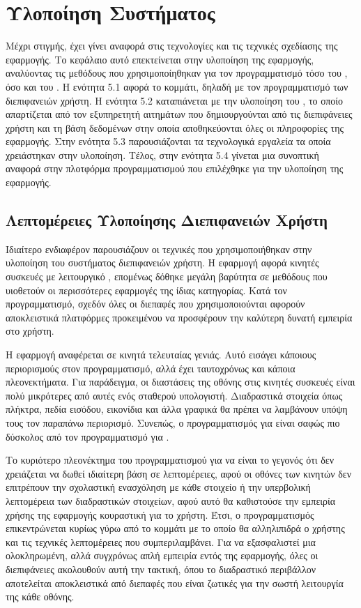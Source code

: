\chapter{Υλοποίηση Συστήματος}
\label{chap5}

Μέχρι στιγμής, έχει γίνει αναφορά στις τεχνολογίες και τις τεχνικές σχεδίασης της εφαρμογής. Το κεφάλαιο αυτό επεκτείνεται στην υλοποίηση της εφαρμογής, αναλύοντας τις μεθόδους που χρησιμοποίηθηκαν για τον προγραμματισμό τόσο του , όσο και του . Η ενότητα 5.1 αφορά το  κομμάτι, δηλαδή με τον προγραμματισμό των διεπιφανειών χρήστη. Η ενότητα 5.2 καταπιάνεται με την υλοποίηση του , το οποίο απαρτίζεται από τον εξυπηρετητή αιτημάτων που δημιουργούνται από τις διεπιφάνειες χρήστη και τη βάση δεδομένων στην οποία αποθηκεύονται όλες οι πληροφορίες της εφαρμογής. Στην ενότητα 5.3 παρουσιάζονται τα τεχνολογικά εργαλεία τα οποία χρειάστηκαν στην υλοποίηση. Τέλος, στην ενότητα 5.4 γίνεται μια συνοπτική αναφορά στην πλοτφόρμα προγραμματισμού που επιλέχθηκε για την υλοποίηση της εφαρμογής. 


\section{Λεπτομέρειες Υλοποίησης Διεπιφανειών Χρήστη}
Ιδιαίτερο ενδιαφέρον παρουσιάζουν οι τεχνικές που χρησιμοποιήθηκαν στην υλοποίηση του συστήματος διεπιφανειών χρήστη. Η εφαρμογή αφορά κινητές συσκευές με λειτουργικό , επομένως δόθηκε μεγάλη βαρύτητα σε μεθόδους που υιοθετούν οι περισσότερες  εφαρμογές της ίδιας κατηγορίας. Κατά τον προγραμματισμό, σχεδόν όλες οι διεπαφές που χρησιμοποιούνται αφορούν αποκλειστικά  πλατφόρμες προκειμένου να προσφέρουν την καλύτερη δυνατή εμπειρία στο χρήστη.

Η εφαρμογή αναφέρεται σε κινητά τελευταίας γενιάς. Αυτό εισάγει κάποιους περιορισμούς στον προγραμματισμό, αλλά έχει ταυτοχρόνως και κάποια πλεονεκτήματα. Για παράδειγμα, οι διαστάσεις της οθόνης στις κινητές συσκευές είναι πολύ μικρότερες από αυτές ενός σταθερού υπολογιστή. Διαδραστικά στοιχεία όπως πλήκτρα, πεδία εισόδου, εικονίδια και άλλα γραφικά θα πρέπει να λαμβάνουν υπόψη τους τον παραπάνω περιορισμό. Συνεπώς, ο προγραμματισμός για  είναι σαφώς πιο δύσκολος από τον προγραμματισμό για .

Το κυριότερο πλεονέκτημα του προγραμματισμού για να  είναι το γεγονός ότι δεν χρειάζεται να δωθεί ιδιαίτερη βάση σε λεπτομέρειες, αφού οι οθόνες των κινητών δεν επιτρέπουν την σχολαστική ενασχόληση με κάθε στοιχείο ή την υπερβολική λεπτομέρεια των διαδραστικών στοιχείων, αφού αυτό θα καθιστούσε την εμπειρία χρήσης της εφαρμογής κουραστική για το χρήστη. Έτσι, ο προγραμματισμός επικεντρώνεται κυρίως γύρω από το κομμάτι με το οποίο θα αλληλιπιδρά ο χρήστης και τις τεχνικές λεπτομέρειες που συμπεριλαμβάνει. Για να εξασφαλιστεί μια ολοκληρωμένη, αλλά συγχρόνως απλή εμπειρία εντός της εφαρμογής, όλες οι διεπιφάνειες ακολουθούν αυτή την τακτική, όπου το διαδραστικό περιβάλλον αποτελείται αποκλειστικά από διεπαφές που είναι ζωτικές για την σωστή λειτουργία της κάθε οθόνης.


